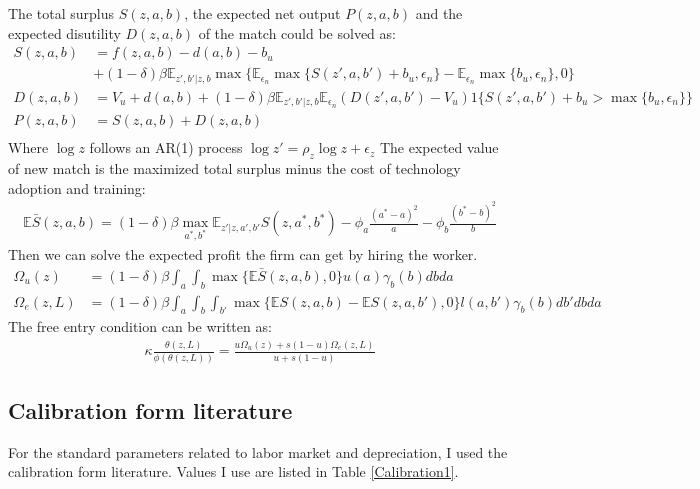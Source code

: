 \documentclass[12pt]{article}
\newcommand{\E}{\mathbb{E}}
\newcommand{\1}{\mathbb{1}}
\begin{document}
The total surplus $S(z,a,b)$, the expected net output $P(z,a,b)$ and the expected disutility $D(z,a,b)$ of the match could be solved as: 
\begin{align*}
S(z,a,b) &= f(z,a,b)-d(a,b)-b_u \\
			 &+(1-\delta)\beta \E_{z',b'|z,b}\max\{\E_{\epsilon_n}\max\{S(z',a,b')+b_u,\epsilon_n\}-\E_{\epsilon_n}\max\{b_u,\epsilon_n\},0 \}  \\
D(z,a,b) &=V_u+d(a,b)+(1-\delta)\beta \E_{z',b'|z,b}\E_{\epsilon_n}(D(z',a,b')-V_u)1\{{S(z',a,b')+b_u>\max\{b_u,\epsilon_n\}}\} \\
P(z,a,b) &= S(z,a,b)+D(z,a,b) \\
\end{align*}
Where $\log z$ follows an AR(1) process $\log z' = \rho_z \log z +\epsilon_z$
The expected value of new match is the maximized total surplus minus the cost of technology adoption and training: 
\begin{align*}
\E\bar{S}(z,a,b) = (1-\delta)\beta\max _{a^*,b^*}  \E_{z'|z,a',b'}S(z,a^*,b^*)-\phi_a\frac{(a^*-a)^2}{a}-\phi_b\frac{(b^*-b)^2}{b}
\end{align*}
Then we can solve the expected profit the firm can get by hiring the worker. 
\begin{align*}
\Omega_u(z) &= (1-\delta)\beta\int_a \int_b \max\{\E\bar{S}(z,a,b),0\}u(a)\gamma_b(b)dbda \\
\Omega_e(z,L) &= (1-\delta)\beta\int_a\int_b\int_{b'}\max\{\E S(z,a,b)-\E S(z,a,b'),0\}l(a,b')\gamma_b(b)db'dbda 
\end{align*}
The free entry condition can be written as: 
\begin{align*}
\kappa \frac{\theta(z,L)}{\phi(\theta(z,L))} =  \frac{u \Omega_u(z)+s(1-u)\Omega_e(z,L)}{u+s(1-u)} 
\end{align*}

\subsection{Calibration form literature}
For the standard parameters related to labor market and depreciation, I used the calibration form literature. Values I use are listed in Table \ref{Calibration1}. \\
\end{document}
